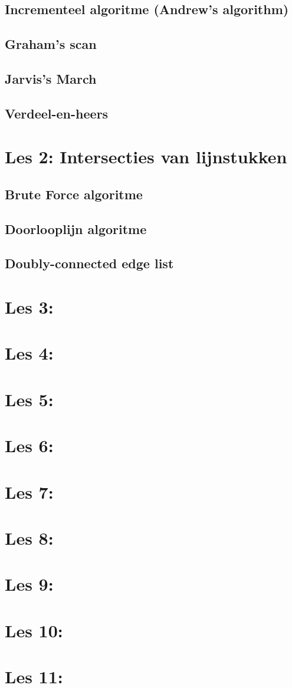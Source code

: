 \documentclass[12pt,a4paper]{article}
\begin{document}
	\subsection{Incrementeel algoritme 	(Andrew's algorithm)}
	\subsection{Graham's scan}
	\subsection{Jarvis's March}
	\subsection{Verdeel-en-heers}
	\section{Les 2: Intersecties van lijnstukken}
	\subsection{Brute Force algoritme}
	\subsection{Doorlooplijn algoritme}
	\subsection{Doubly-connected edge 	list}
	\section{Les 3: }
	\section{Les 4: }
	\section{Les 5: }
	\section{Les 6: }
	\section{Les 7: }
	\section{Les 8: }
	\section{Les 9: }
	\section{Les 10: }
	\section{Les 11: }
\end{document}
